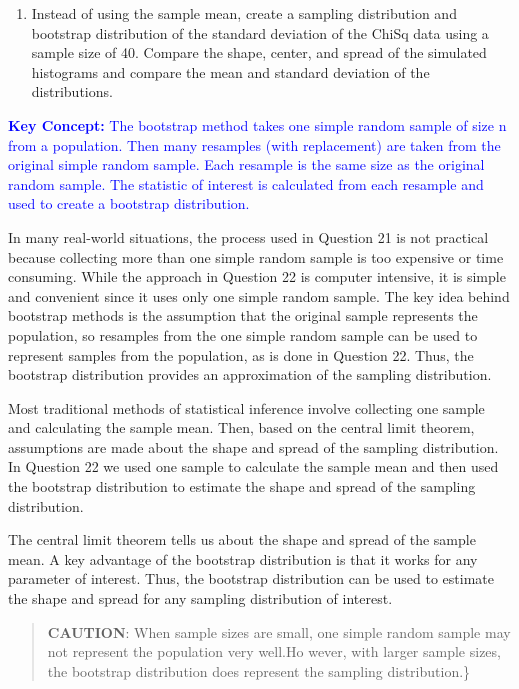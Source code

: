 \documentclass[
]{book}
\providecommand{\tightlist}{%
  \setlength{\itemsep}{0pt}\setlength{\parskip}{0pt}}
\begin{document}
\begin{enumerate}
\def\labelenumi{\arabic{enumi}.}
\setcounter{enumi}{22}
\tightlist
\item
  Instead of using the sample mean, create a sampling distribution and bootstrap distribution of the standard deviation of the ChiSq data using a sample size of 40. Compare the shape, center, and spread of the simulated histograms and compare the mean and standard deviation of the distributions.
\end{enumerate}

\textbf{\textcolor{blue}{Key Concept:}}
\textcolor{blue}{The bootstrap method takes one simple random sample of size n from a population. Then many resamples (with replacement) are taken from the original simple random sample. Each resample is the same size as the original random sample. The statistic of interest is calculated from each resample and used to create a bootstrap distribution.}

In many real-world situations, the process used in Question 21 is not practical because collecting more than one simple random sample is too expensive or time consuming. While the approach in Question 22 is computer intensive, it is simple and convenient since it uses only one simple random sample. The key idea behind bootstrap methods is the assumption that the original sample represents the population, so resamples from the one simple random sample can be used to represent samples from the population, as is done in Question 22. Thus, the bootstrap distribution provides an approximation of the sampling distribution.

Most traditional methods of statistical inference involve collecting one sample and calculating the sample mean. Then, based on the central limit theorem, assumptions are made about the shape and spread of the sampling distribution. In Question 22 we used one sample to calculate the sample mean and then used the bootstrap distribution to estimate the shape and spread of the sampling distribution.

The central limit theorem tells us about the shape and spread of the sample mean. A key advantage of the bootstrap distribution is that it works for any parameter of interest. Thus, the bootstrap distribution can be used to estimate the shape and spread for any sampling distribution of interest.

\begin{quote}
\textbf{CAUTION}: When sample sizes are small, one simple random sample may not represent the population very well.Ho wever, with larger sample sizes, the bootstrap distribution does represent the sampling distribution.\}
\end{quote}
\end{document}
